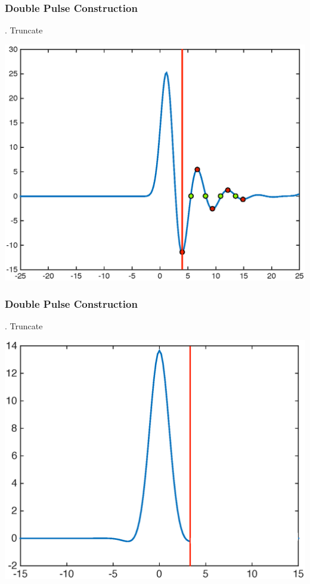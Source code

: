 \documentclass[16pt]{beamer}
\begin{document}
\begin{frame}
	\frametitle{Double Pulse Construction}
	\fontsize{16}{7.2}. Truncate
	\begin{center}
	\includegraphics[width=0.8\linewidth]{images/singlepulsemagtailcut}
	\end{center}

\end{frame}

\begin{frame}
	\frametitle{Double Pulse Construction}
	\fontsize{16}{7.2}. Truncate
	\begin{center}
	\includegraphics[width=0.8\linewidth]{images/single}
	\end{center}
\end{frame}
\end{document}
